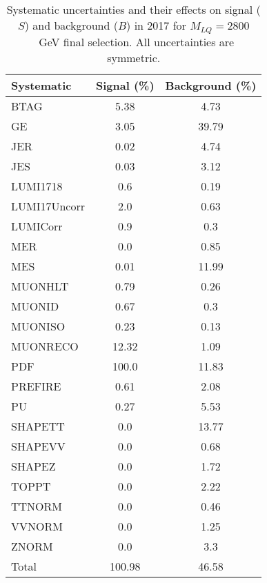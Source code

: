 \begin{table}[htbp]
\begin{center}
\caption{Systematic uncertainties and their effects on signal ($S$) and background ($B$) in 2017 for $M_{LQ}=2800$~GeV final selection. All uncertainties are symmetric.}
\begin{tabular}{lcc}
\hline\hline
Systematic & Signal (\%) & Background (\%) \\ \hline 
BTAG & 5.38 & 4.73\\ 
GE & 3.05 & 39.79\\ 
JER & 0.02 & 4.74\\ 
JES & 0.03 & 3.12\\ 
LUMI1718 & 0.6 & 0.19\\ 
LUMI17Uncorr & 2.0 & 0.63\\ 
LUMICorr & 0.9 & 0.3\\ 
MER & 0.0 & 0.85\\ 
MES & 0.01 & 11.99\\ 
MUONHLT & 0.79 & 0.26\\ 
MUONID & 0.67 & 0.3\\ 
MUONISO & 0.23 & 0.13\\ 
MUONRECO & 12.32 & 1.09\\ 
PDF & 100.0 & 11.83\\ 
PREFIRE & 0.61 & 2.08\\ 
PU & 0.27 & 5.53\\ 
SHAPETT & 0.0 & 13.77\\ 
SHAPEVV & 0.0 & 0.68\\ 
SHAPEZ & 0.0 & 1.72\\ 
TOPPT & 0.0 & 2.22\\ 
TTNORM & 0.0 & 0.46\\ 
VVNORM & 0.0 & 1.25\\ 
ZNORM & 0.0 & 3.3\\ 
Total & 100.98 & 46.58\\ \hline \hline
\end{tabular}
\label{tab:SysUncertainties_uujj_2800}
\end{center}
\end{table}

